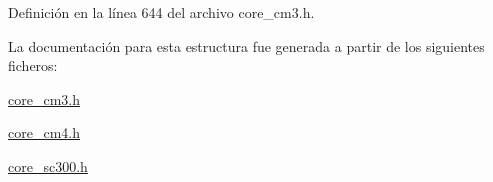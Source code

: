 Definición en la línea 644 del archivo core\+\_\+cm3.\+h.



La documentación para esta estructura fue generada a partir de los siguientes ficheros\+:\begin{DoxyCompactItemize}
\item 
\hyperlink{core__cm3_8h}{core\+\_\+cm3.\+h}\item 
\hyperlink{core__cm4_8h}{core\+\_\+cm4.\+h}\item 
\hyperlink{core__sc300_8h}{core\+\_\+sc300.\+h}\end{DoxyCompactItemize}
